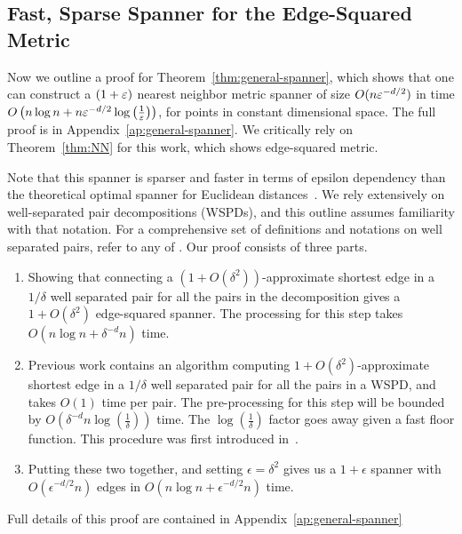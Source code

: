 \subsection{Fast, Sparse Spanner for the Edge-Squared
Metric}
\label{sec:general-spanner}

Now we outline a proof for Theorem~\ref{thm:general-spanner}, which shows
that one can construct a $(1+\varepsilon)$ nearest neighbor metric spanner of size
$O(n \varepsilon^{-d/2})$ in
time $O\left(n \log n + n \varepsilon^{-d/2} \log \left(\frac{1}{\varepsilon}\right)\right)$, 
for points in constant dimensional space. The full proof is in
Appendix~\ref{ap:general-spanner}. We critically rely on
Theorem~\ref{thm:NN} for this work, which shows
edge-squared metric.

Note that this spanner is sparser and faster in terms of epsilon dependency
than the theoretical optimal spanner for Euclidean distances~\cite{Le19}.
We rely extensively on well-separated pair decompositions
(WSPDs),
and this outline assumes familiarity with that notation.
For a comprehensive set of definitions and notations on well separated
pairs, refer to any of \cite{Callahan1995, Arya2016, Callahan1993,
arya95euclid}.  
Our proof consists of three parts.
\begin{enumerate}
\item Showing that connecting a $(1+O(\delta^2))$-approximate shortest edge
in a $1/\delta$ well separated pair for all the pairs in the decomposition
gives a $1+O(\delta^2)$ edge-squared spanner.
The processing for this step takes $O(n \log n + \delta^{-d}n)$ time.
\item Previous work contains an algorithm computing
  $1+O(\delta^2)$-approximate shortest edge in a $1/\delta$ well
    separated pair for all the pairs in a WSPD, and takes
    $O(1)$ time per pair. The pre-processing for this step will be
    bounded by $O(\delta^{-d}n\log\left(\frac{1}{\delta}\right))$ time. The $\log\left(\frac{1}{\delta}\right)$ factor goes away given a fast floor function. 
    This procedure was first introduced in~\cite{Callahan1995}.

\item Putting these two together, and setting $\epsilon = \delta^2$
gives us a $1+\epsilon$ spanner with
$O(\epsilon^{-d/2}n)$ edges in
    $O(n \log n + \epsilon^{-d/2}n)$ time.
\end{enumerate}
Full details of this proof are contained in Appendix~\ref{ap:general-spanner}
